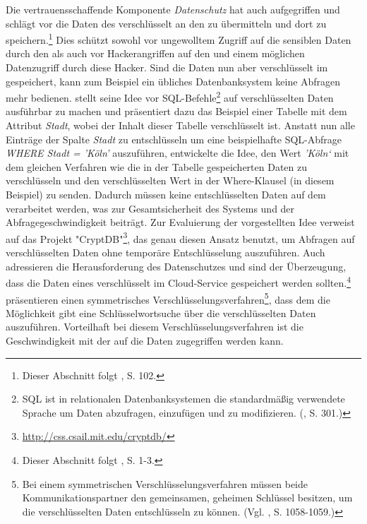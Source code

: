 \label{id:61}Die vertrauensschaffende Komponente \emph{Datenschutz} hat auch \cite{Suciu.2012} aufgegriffen und schlägt vor die Daten des \CSUs verschlüsselt an den \CS zu übermitteln und dort zu speichern.\footnote{Dieser Abschnitt folgt \cite{Suciu.2012}, S. 102.}
Dies schützt sowohl vor ungewolltem Zugriff auf die sensiblen Daten durch den \CSPComma als auch vor Hackerangriffen auf den \CS und einem möglichen Datenzugriff durch diese Hacker.
Sind die Daten nun aber verschlüsselt im \CS gespeichert, kann zum Beispiel ein übliches Datenbanksystem keine Abfragen mehr bedienen. 
\cite{Suciu.2012} stellt seine Idee vor \acs{SQL}-Befehle\footnote{\acf{SQL} ist in relationalen Datenbanksystemen die standardmäßig verwendete Sprache um Daten abzufragen, einzufügen und zu modifizieren. (\cite{Laudon.2010}, S. 301.)} auf verschlüsselten Daten ausführbar zu machen und präsentiert dazu das Beispiel einer Tabelle mit dem Attribut \emph{Stadt}, wobei der Inhalt dieser Tabelle verschlüsselt ist. 
Anstatt nun alle Einträge der Spalte \emph{Stadt} zu entschlüsseln um eine beispielhafte SQL-Abfrage \emph{WHERE Stadt = 'Köln'} auszuführen, entwickelte \cite{Suciu.2012} die Idee, den Wert \emph{'Köln‘} mit dem gleichen Verfahren wie die in der Tabelle gespeicherten Daten zu verschlüsseln und den verschlüsselten Wert in der Where-Klausel (in diesem Beispiel) zu senden. 
Dadurch müssen keine entschlüsselten Daten auf dem \CS verarbeitet werden, was zur Gesamtsicherheit des Systems und der Abfragegeschwindigkeit beiträgt.
Zur Evaluierung der vorgestellten Idee verweist \cite{Suciu.2012} auf das Projekt "CryptDB"\footnote{\url{http://css.csail.mit.edu/cryptdb/}}, das genau diesen Ansatz benutzt, um Abfragen auf verschlüsselten Daten ohne temporäre Entschlüsselung auszuführen.
\newline
Auch \cite{Yu.2013} adressieren die Herausforderung des Datenschutzes und sind der Überzeugung, dass die Daten eines \CSUs verschlüsselt im Cloud-\linebreak Service gespeichert werden sollten.\footnote{Dieser Abschnitt folgt \cite{Yu.2013}, S. 1-3.}
\cite{Yu.2013} präsentieren einen symmetrisches Verschlüsselungsverfahren\footnote{Bei einem symmetrischen Verschlüsselungsverfahren müssen beide Kommunikationspartner den gemeinsamen, geheimen Schlüssel besitzen, um die verschlüsselten Daten entschlüsseln zu können. (Vgl. \cite{Laudon.2010}, S. 1058-1059.)}, dass dem \CSU die Möglichkeit gibt eine Schlüsselwortsuche über die verschlüsselten Daten auszuführen. 
Vorteilhaft bei diesem Verschlüsselungsverfahren ist die Geschwindigkeit mit der auf die Daten zugegriffen werden kann. 
